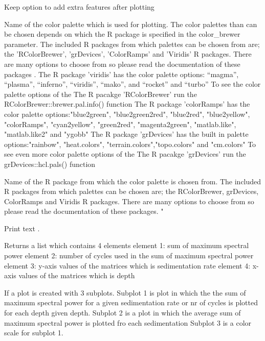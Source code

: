 \documentclass[a4paper]{book}
\begin{document}
\begin{Arguments}
\begin{ldescription}
\item[\code{keep\_editable}] Keep option to add extra features after plotting  

\item[\code{palette\_name}] Name of the color palette which is used for plotting.
The color palettes than can be chosen depends on which the R package is specified in
the color\_brewer parameter. The included R packages from which palettes can be chosen
from are; the 'RColorBrewer', 'grDevices', 'ColorRamps' and 'Viridis' R packages.
There are many options to choose from so please
read the documentation of these packages .
The R package 'viridis' has the color palette options: “magma”, “plasma”,
“inferno”, “viridis”, “mako”, and “rocket”  and “turbo”
To see the color palette options of the The R pacakge 'RColorBrewer' run
the RColorBrewer::brewer.pal.info() function
The R package 'colorRamps' has the color palette options:"blue2green",
"blue2green2red", "blue2red",    "blue2yellow", "colorRamps",    "cyan2yellow",
"green2red", "magenta2green", "matlab.like", "matlab.like2" and    "ygobb"
The R package 'grDevices' has the built in  palette options:"rainbow",
"heat.colors", "terrain.colors","topo.colors" and "cm.colors"
To see even more color palette options of the The R pacakge 'grDevices' run
the grDevices::hcl.pals() function

\item[\code{color\_brewer}] Name of the R package from which the color palette is chosen from.
The included R packages from which palettes can be chosen
are; the RColorBrewer, grDevices, ColorRamps and Viridis R packages.
There are many options to choose from so please
read the documentation of these packages. "

\item[\code{verbose}] Print text .
\end{ldescription}
\end{Arguments}
%
\begin{Value}
Returns a list which contains 4 elements
element 1: sum of maximum spectral power
element 2: number of cycles used in the sum of maximum spectral power
element 3: y-axis values of the matrices which is sedimentation rate
element 4: x-axis values of the matrices which is depth

If  a plot is created with 3 subplots.
Subplot 1 is plot in which the the sum of maximum spectral power for a
given sedimentation rate or nr of cycles is plotted for each depth given depth.
Subplot 2 is a plot in which the average sum of maximum spectral power is plotted fro each sedimentation
Subplot 3 is a color scale for subplot 1.
\end{Value}
\end{document}
